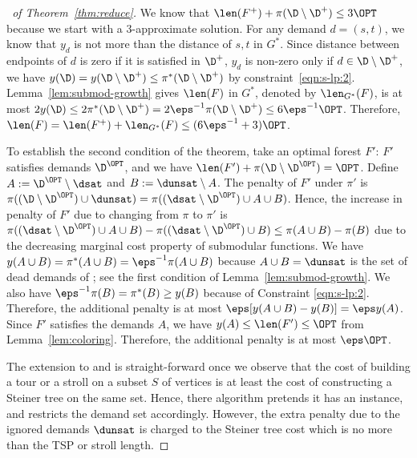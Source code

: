 \begin{proof}[\proofname\ of Theorem~\ref{thm:reduce}]
  We know that $\len(F^+) + \pi(\D \setminus \D^+) \leq 3\OPT$ because we
start with a $3$-approximate solution.
For any demand $d=(s,t)$, we know that $y_d$ is not more than the distance of $s, t$ in $G^\ast$.
Since distance between endpoints of $d$ is zero if it is satisfied in $\D^+$,
$y_d$ is non-zero only if $d\in\D\setminus\D^+$, we have $y(\D) = y(\D\setminus\D^+)\leq \pi^\ast(\D\setminus\D^+)$ by constraint~\eqref{eqn:s-lp:2}.
  Lemma~\ref{lem:submod-growth} gives $\len(F)$ in $G^\ast$, denoted by $\len_{G^\ast}(F)$,
is at most $2 y(\D) \leq 2\pi^\ast(\D\setminus\D^+) = 2\eps^{-1}\pi(\D\setminus\D^+) \leq 6\eps^{-1}\OPT$.
  Therefore, $\len(F) = \len(F^+) + \len_{G^\ast}(F) \leq (6\eps^{-1} + 3)\OPT$. 

To establish the second condition of the theorem, take an optimal forest $F'$:
$F'$ satisfies demands $\D^\OPT$, and we have $\len(F') + \pi(\D \setminus \D^\OPT) = \OPT$.
Define $A := \D^\OPT \setminus \dsat$ and $B := \dunsat \setminus A$.
The penalty of $F'$ under $\pi'$ is $\pi((\D\setminus\D^\OPT) \cup \dunsat) = \pi((\dsat\setminus\D^\OPT) \cup A \cup B)$.
Hence, the increase in penalty of $F'$ due to changing from $\pi$ to $\pi'$
is $\pi((\dsat\setminus\D^\OPT) \cup A \cup B) - \pi((\dsat\setminus\D^\OPT)  \cup B) \leq \pi(A\cup B) - \pi(B)$ due to the decreasing marginal cost property of submodular functions. 
We have $y(A \cup B) = \pi^\ast(A \cup B) = \eps^{-1}\pi(A\cup B)$ because $A\cup B = \dunsat$ is the set of dead demands of ; see the first condition of Lemma~\ref{lem:submod-growth}.
We also have $\eps^{-1}\pi(B) = \pi^\ast(B) \geq y(B)$ because of Constraint \eqref{eqn:s-lp:2}.
Therefore, the additional penalty is at most $\eps [ y(A \cup B) - y(B) ] = \eps y(A)$.
Since $F'$ satisfies the demands $A$,
we have $y(A) \leq \len(F') \leq \OPT$ from Lemma~\ref{lem:coloring}.
Therefore, the additional penalty is at most $\eps \OPT$.


The extension to \spctsp and \spcs is straight-forward once we observe
that the cost of building a tour or a stroll on a subset $S$ of vertices
is at least the cost of constructing a Steiner tree on the same set.
Hence, there algorithm pretends it has an  instance, and restricts
the demand set accordingly.  However, the extra penalty due to the
ignored demands $\dunsat$ is charged to the Steiner tree cost which
is no more than the TSP or stroll length.
\end{proof}





















